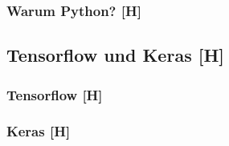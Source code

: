 \subsubsection{Warum Python? [H]}
\subsection{Tensorflow und Keras [H]}
\subsubsection{Tensorflow [H]}
\subsubsection{Keras [H]}











